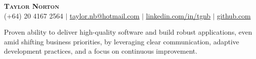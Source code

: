 \documentclass[letterpaper,11pt]{article}
\begin{document}

\begin{center}
    \textbf{\Huge \scshape Taylor Norton} \\ \vspace{1pt}
    \small (+64) 20 4167 2564 $|$ \href{mailto:taylor.nb@hotmail.com}{\underline{taylor.nb@hotmail.com}} $|$ 
    \href{https://linkedin.com/in/tgnb}{\underline{linkedin.com/in/tgnb}} $|$
    \href{https://github.com/lil-snorts}{\underline{github.com}}
\end{center}
Proven ability to deliver high-quality software and build robust applications, even amid shifting business priorities, by leveraging clear communication, adaptive development practices, and a focus on continuous improvement.


\end{document}
